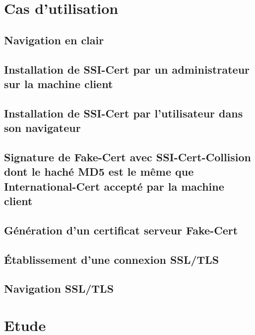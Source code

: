 \documentclass[a4paper,11pt,french]{article}
\begin{document}
\section{Cas d'utilisation}

\subsection{Navigation en clair}


\subsection{Installation de SSI-Cert par un administrateur sur la machine client}


\newpage
\subsection{Installation de SSI-Cert par l'utilisateur dans son navigateur}


\subsection{Signature de Fake-Cert avec SSI-Cert-Collision dont le haché MD5 est le même que International-Cert accepté par la machine client }


\subsection{Génération d'un certificat serveur Fake-Cert}


\subsection{Établissement d'une connexion SSL/TLS}


\newpage
\subsection{Navigation SSL/TLS}


\section{Etude}
\end{document}
